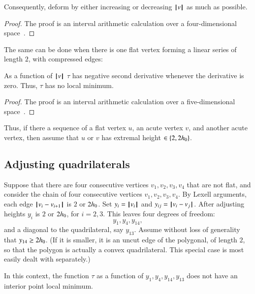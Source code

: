 {Consequently,  deform by either increasing or decreasing ${{\hskip0.1em|\hskip-0.15em|\hskip0.1em}v{\hskip0.1em|\hskip-0.15em|\hskip0.1em}}$ as much as possible.  

\begin{proof}
The proof is an interval arithmetic calculation over a four-dimensional space~\cite[cc:d2a]{hales:2009:nonlinear}.  %
\end{proof}


The same can be done when there is one flat vertex forming a linear series of length $2$, with compressed edges:

\begin{lemma}
As a function of ${{\hskip0.1em|\hskip-0.15em|\hskip0.1em}v{\hskip0.1em|\hskip-0.15em|\hskip0.1em}}$
 $\tau$ has negative second derivative whenever the derivative is zero.  Thus, $\tau$ has no local minimum.
\end{lemma}

\begin{proof}
The proof is an interval arithmetic calculation over a five-dimensional space~\cite[cc:d2b]{hales:2009:nonlinear}. %
\end{proof}


Thus, if there a sequence of a flat vertex $u$, an acute vertex $v$, and another acute vertex, then  assume that $u$ or $v$ has extremal height $\in\{2,2{h_0}\}$.



\subsection{Adjusting quadrilaterals}

Suppose that there are four consecutive vertices $v_1,v_2,v_3,v_4$ that are not flat, and consider the chain of four consecutive vertices $v_1,v_2,v_3,v_4$. By Lexell arguments, each edge ${\hskip0.1em|\hskip-0.15em|\hskip0.1em}v_i - v_{i+1}{\hskip0.1em|\hskip-0.15em|\hskip0.1em}$ is $2$ or $2{h_0}$. Set $y_i = {{\hskip0.1em|\hskip-0.15em|\hskip0.1em}v_i{\hskip0.1em|\hskip-0.15em|\hskip0.1em}}$ and $y_{ij} = {\hskip0.1em|\hskip-0.15em|\hskip0.1em}v_i - v_j{\hskip0.1em|\hskip-0.15em|\hskip0.1em}$. After adjusting heights $y_i$ is $2$ or $2{h_0}$, for $i=2,3$. This leaves four degrees of freedom:
$$
y_1,y_4,y_{14},
$$
and a diagonal to the quadrilateral, say $y_{13}$. Assume without loss of generality that  $y_{14}\ge 2{h_0}$.  (If it is smaller, it is an uncut edge of the polygonal, of length $2$, so that the polygon is actually a convex quadrilateral.  This special case is most easily dealt with separately.)

\begin{lemma}
In this context, the function $\tau$ as a function of $y_1,y_4,y_{14},y_{13}$ does not have an interior point local minimum.
\end{lemma}

}
